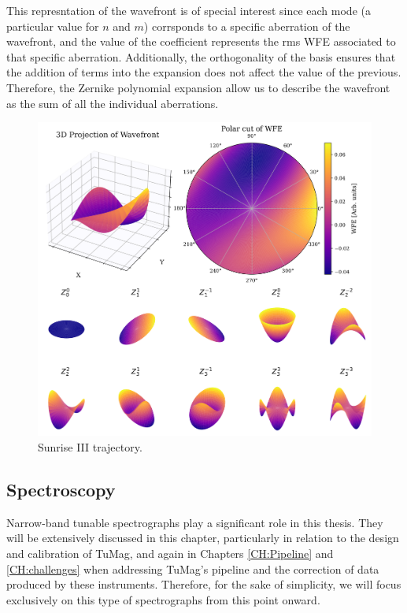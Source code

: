 This represntation of the wavefront is of special interest since each mode (a particular value for $n$ and $m$) corrsponds to a specific aberration of the wavefront, and the value of the coefficient represents the rms WFE associated to that specific aberration. Additionally, the orthogonality of the basis ensures that the addition of terms into the expansion does not affect the value of the previous. Therefore, the Zernike polynomial expansion allow us to describe the wavefront as the sum of all the individual aberrations. 

\begin{figure}
  \centering
  \includegraphics[width = \textwidth]{figures/Introduction/zernikes_combined.pdf}
  \caption{Sunrise III trajectory.} 
  \label{fig_intro: sunrise_trajectory}
\end{figure}

\subsection{Spectroscopy}

Narrow-band tunable spectrographs play a significant role in this thesis. They will be extensively discussed in this chapter, particularly in relation to the design and calibration of TuMag, and again in Chapters \ref{CH:Pipeline} and \ref{CH:challenges} when addressing TuMag's pipeline and the correction of data produced by these instruments. Therefore, for the sake of simplicity, we will focus exclusively on this type of spectrographs from this point onward.

